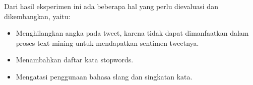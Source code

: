   
Dari hasil eksperimen ini ada beberapa hal yang perlu dievaluasi dan dikembangkan, yaitu:
\begin{itemize}
	\item Menghilangkan angka pada tweet, karena tidak dapat dimanfaatkan dalam proses text mining untuk mendapatkan sentimen tweetnya.
	\item Menambahkan daftar kata stopwords.
	\item Mengatasi penggunaan bahasa slang dan singkatan kata.
\end{itemize}

